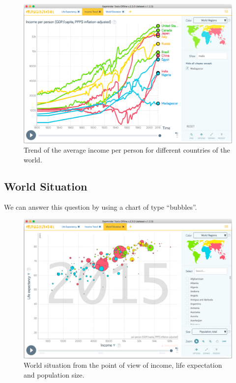 \begin{figure}[h]
	\centering
	\includegraphics[width=0.95\columnwidth]{figures/income-trend}
	\caption{Trend of the average income per person for different countries of the world.}
	\label{fig:income-trend}
\end{figure}


\subsection{World Situation}
We can answer this question by using a chart of type ``bubbles''.

\begin{figure}[h]
	\centering
	\includegraphics[width=0.95\columnwidth]{figures/world-situation}
	\caption{World situation from the point of view of income, life expectation and population size.}
	\label{fig:world-situation}
\end{figure}
